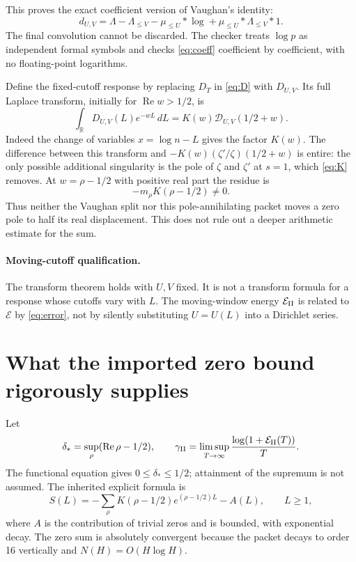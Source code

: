 \documentclass[11pt]{article}
\newcommand{\dd}{\,d}
\newcommand{\Ree}{\operatorname{Re}}
\newcommand{\E}{\mathcal E}
\newcommand{\D}{\mathcal D}
\begin{document}
This proves the exact coefficient version of Vaughan's identity:
\begin{equation}\label{eq:coeff}
 d_{U,V}=\Lambda-\Lambda_{\le V}
                 -\mu_{\le U}*\log+\mu_{\le U}*\Lambda_{\le V}*1.
\end{equation}
The final convolution cannot be discarded. The checker treats $\log p$ as
independent formal symbols and checks \eqref{eq:coeff} coefficient by
coefficient, with no floating-point logarithms.

Define the fixed-cutoff response by replacing $D_T$ in \eqref{eq:D} with
$D_{U,V}$. Its full Laplace transform, initially for $\Ree w>1/2$, is
\[
 \int_{\mathbb R}D_{U,V}(L)e^{-wL}\dd L
       =K(w)\D_{U,V}(1/2+w).
\]
Indeed the change of variables $x=\log n-L$ gives the factor $K(w)$.
The difference between this transform and
$-K(w)(\zeta'/\zeta)(1/2+w)$ is entire: the only possible additional
singularity is the pole of $\zeta$ and $\zeta'$ at $s=1$, which
\eqref{eq:K} removes. At $w=\rho-1/2$ with positive real part the residue is
\begin{equation}\label{eq:residue}
 -m_\rho K(\rho-1/2)\ne0.
\end{equation}
Thus neither the Vaughan split nor this pole-annihilating packet moves a
zero pole to half its real displacement. This does not rule out a deeper
arithmetic estimate for the sum.

\paragraph{Moving-cutoff qualification.}
The transform theorem holds with $U,V$ fixed. It is not a transform formula
for a response whose cutoffs vary with $L$. The moving-window energy
$\E_{\rm II}$ is related to $\E$ by \eqref{eq:error}, not by silently
substituting $U=U(L)$ into a Dirichlet series.

\section{What the imported zero bound rigorously supplies}
Let
\[
 \delta_* =\sup_\rho(\Ree\rho-1/2),\qquad
 \gamma_{\rm II}=\limsup_{T\to\infty}
                 \frac{\log(1+\E_{\rm II}(T))}{T}.
\]
The functional equation gives $0\le\delta_*\le1/2$; attainment of the
supremum is not assumed. The inherited explicit formula is
\begin{equation}\label{eq:explicit}
 S(L)=-\sum_\rho K(\rho-1/2)e^{(\rho-1/2)L}-A(L),\qquad L\ge1,
\end{equation}
where $A$ is the contribution of trivial zeros and is bounded, with
exponential decay. The zero sum is absolutely convergent because the
packet decays to order 16 vertically and $N(H)=O(H\log H)$.
\end{document}
